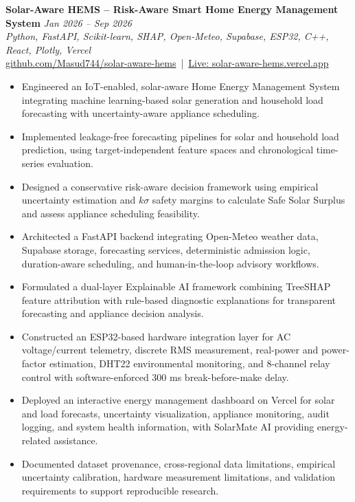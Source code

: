 \documentclass[11pt,a4paper]{article}
\begin{document}
\textbf{Solar-Aware HEMS -- Risk-Aware Smart Home Energy Management System} \hfill \textit{Jan 2026 -- Sep 2026} \\
\textit{Python, FastAPI, Scikit-learn, SHAP, Open-Meteo, Supabase, ESP32, C++, React, Plotly, Vercel} \\
\href{https://github.com/Masud744/solar-aware-hems}{github.com/Masud744/solar-aware-hems} \,|\, \href{https://solar-aware-hems.vercel.app}{Live: solar-aware-hems.vercel.app}
\begin{itemize}
    \item Engineered an IoT-enabled, solar-aware Home Energy Management System integrating machine learning-based solar generation and household load forecasting with uncertainty-aware appliance scheduling.
    \item Implemented leakage-free forecasting pipelines for solar and household load prediction, using target-independent feature spaces and chronological time-series evaluation.
    \item Designed a conservative risk-aware decision framework using empirical uncertainty estimation and $k\sigma$ safety margins to calculate Safe Solar Surplus and assess appliance scheduling feasibility.
    \item Architected a FastAPI backend integrating Open-Meteo weather data, Supabase storage, forecasting services, deterministic admission logic, duration-aware scheduling, and human-in-the-loop advisory workflows.
    \item Formulated a dual-layer Explainable AI framework combining TreeSHAP feature attribution with rule-based diagnostic explanations for transparent forecasting and appliance decision analysis.
    \item Constructed an ESP32-based hardware integration layer for AC voltage/current telemetry, discrete RMS measurement, real-power and power-factor estimation, DHT22 environmental monitoring, and 8-channel relay control with software-enforced 300 ms break-before-make delay.
    \item Deployed an interactive energy management dashboard on Vercel for solar and load forecasts, uncertainty visualization, appliance monitoring, audit logging, and system health information, with SolarMate AI providing energy-related assistance.
    \item Documented dataset provenance, cross-regional data limitations, empirical uncertainty calibration, hardware measurement limitations, and validation requirements to support reproducible research.
\end{itemize}
\end{document}
